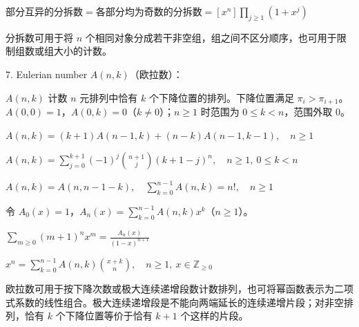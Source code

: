 $\text{部分互异的分拆数}=\text{各部分均为奇数的分拆数}=[x^n]\displaystyle\prod_{j\ge1}(1+x^j)$

分拆数可用于将 $n$ 个相同对象分成若干非空组，组之间不区分顺序，也可用于限制组数或组大小的计数。

7. Eulerian number $A(n,k)$（欧拉数）：\nopagebreak[4]

$A(n,k)$ 计数 $n$ 元排列中恰有 $k$ 个下降位置的排列。下降位置满足 $\pi_i>\pi_{i+1}$。$A(0,0)=1$，$A(0,k)=0$（$k\ne0$）；$n\ge1$ 时范围为 $0\le k<n$，范围外取 $0$。

$A(n,k)=(k+1)A(n-1,k)+(n-k)A(n-1,k-1),\quad n\ge1$

$A(n,k)=\displaystyle\sum_{j=0}^{k+1}(-1)^j\binom{n+1}j(k+1-j)^n,\quad n\ge1,\ 0\le k<n$

$A(n,k)=A(n,n-1-k),\quad\displaystyle\sum_{k=0}^{n-1}A(n,k)=n!,\quad n\ge1$

令 $A_0(x)=1$，$A_n(x)=\sum_{k=0}^{n-1}A(n,k)x^k$（$n\ge1$）。\nopagebreak[4]

$\displaystyle\sum_{m\ge0}(m+1)^nx^m=\frac{A_n(x)}{(1-x)^{n+1}}$

$x^n=\displaystyle\sum_{k=0}^{n-1}A(n,k)\binom{x+k}n,\quad n\ge1,\ x\in\mathbb Z_{\ge0}$

欧拉数可用于按下降次数或极大连续递增段数计数排列，也可将幂函数表示为二项式系数的线性组合。极大连续递增段是不能向两端延长的连续递增片段；对非空排列，恰有 $k$ 个下降位置等价于恰有 $k+1$ 个这样的片段。
